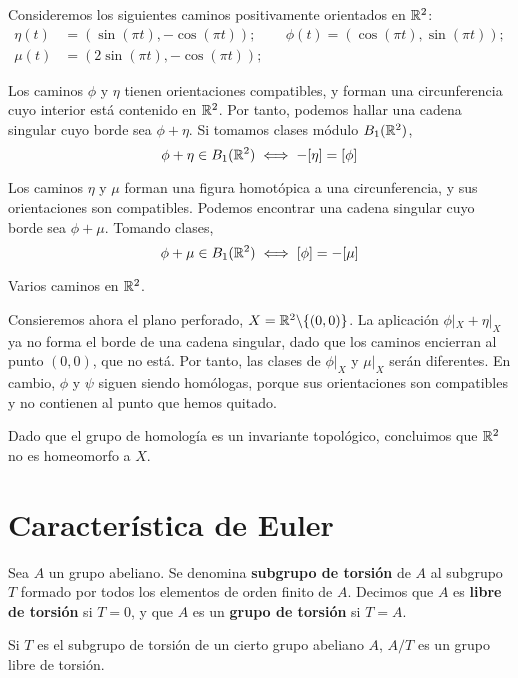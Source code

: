 Consideremos los siguientes caminos positivamente orientados en $\mathbb{R}^2$:
\begin{align*}
\eta(t)	&=(\sin(\pi t),-\cos(\pi t)); &&\phi(t)=(\cos(\pi t),\sin(\pi t));\\
\mu(t)	&=(2\sin(\pi t),-\cos(\pi t));
\end{align*}

Los caminos $\phi$ y $\eta$ tienen orientaciones compatibles, y forman una
circunferencia cuyo interior está contenido en $\mathbb{R}^2$. Por tanto, podemos
hallar una cadena singular cuyo borde sea $\phi+\eta$. Si tomamos clases módulo
$B_1(\mathbb{R}^2)$,
\[\phi+\eta \in B_1(\mathbb{R}^2) \iff -[\eta]=[\phi]\]

Los caminos $\eta$ y $\mu$ forman una figura homotópica a una circunferencia, y
sus orientaciones son compatibles. Podemos encontrar una cadena singular cuyo
borde sea $\phi+\mu$. Tomando clases,
\[\phi+\mu \in B_1(\mathbb{R}^2) \iff [\phi]=-[\mu]\]

\begin{marginfigure}

\caption{Varios caminos en $\mathbb{R}^2$.}
\end{marginfigure}

Consieremos ahora el plano perforado, $X=\mathbb{R}^2\backslash\{(0,0)\}$. La
aplicación $\phi|_X+\eta|_X$ ya no forma el borde de una cadena singular, dado
que los caminos encierran al punto $(0,0)$, que no está. Por tanto, las clases
de $\phi|_X$ y $\mu|_X$ serán diferentes. En cambio, $\phi$ y $\psi$ siguen
siendo homólogas, porque sus orientaciones son compatibles y no contienen al
punto que hemos quitado.

Dado que el grupo de homología es un invariante topológico, concluimos que
$\mathbb{R}^2$ no es homeomorfo a $X$.

\section{Característica de Euler}
\begin{definition}
Sea $A$ un grupo abeliano. Se denomina \textbf{subgrupo de torsión} de $A$ al
subgrupo $T$ formado por todos los elementos de orden finito de $A$. Decimos que
$A$ es \textbf{libre de torsión} si $T=0$, y que $A$ es un \textbf{grupo de
torsión} si $T=A$.
\end{definition}

Si $T$ es el subgrupo de torsión de un cierto grupo abeliano $A$,
$A/T$ es un grupo libre de torsión.

